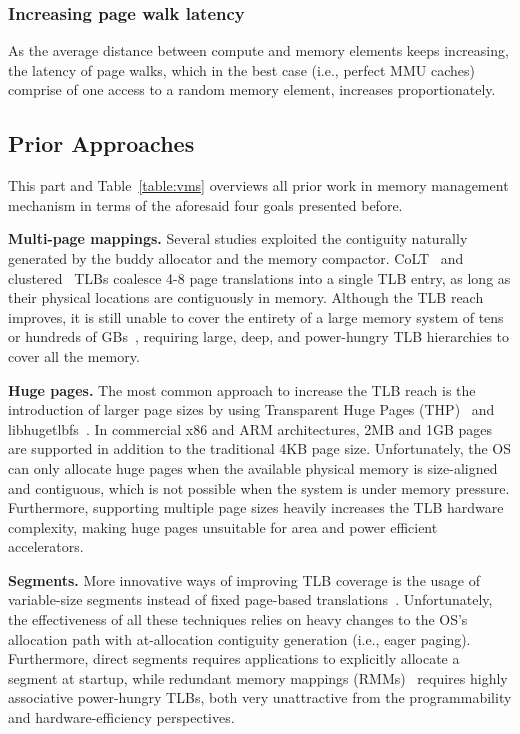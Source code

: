 \subsubsection{Increasing page walk latency}

As the average distance between compute and memory elements keeps increasing, the latency of page walks, which in the best case (i.e., perfect MMU caches) comprise of one access to a random memory element, increases proportionately.  

\subsection{Prior Approaches}

This part and Table~\ref{table:vms} overviews all prior work in memory management mechanism in terms of the aforesaid four goals presented before.

\noindent\textbf{Multi-page mappings.} Several studies exploited
the contiguity naturally generated by the buddy allocator and the
memory compactor. CoLT~\cite{pham:colt} and clustered~\cite{pham:increasing} TLBs coalesce 4-8 page translations into a single TLB entry, as long as their physical locations are contiguously in memory. Although the TLB reach improves, it is still unable to cover the entirety of a large memory system of tens or hundreds of GBs~\cite{gandhi:range}, requiring large, deep, and power-hungry TLB hierarchies to cover all the memory.

\noindent\textbf{Huge pages.} The most common approach to increase the TLB reach is the introduction of larger page sizes by using Transparent Huge Pages (THP)~\cite{transparenthugepages} and libhugetlbfs~\cite{lighugetlbfs}. In commercial x86 and ARM architectures, 2MB and 1GB pages are supported in addition to the traditional 4KB page size. Unfortunately, the OS can only allocate huge pages when the available physical memory is size-aligned and contiguous, which is not possible when the system is under memory pressure. Furthermore, supporting multiple page sizes heavily increases the TLB hardware complexity, making huge pages unsuitable for area and power efficient accelerators.

\noindent\textbf{Segments.} More innovative ways of improving TLB coverage is the usage of variable-size segments instead of fixed page-based translations~\cite{karakostas:redundant, park:hybrid, basu:efficient}. Unfortunately, the effectiveness of all these techniques relies on heavy changes to the OS's allocation path with at-allocation contiguity generation (i.e., eager paging). Furthermore, direct segments requires applications to explicitly allocate a segment at startup, while redundant memory mappings (RMMs)~\cite{karakostas:redundant} requires highly associative power-hungry TLBs, both very unattractive from the programmability and hardware-efficiency perspectives.

